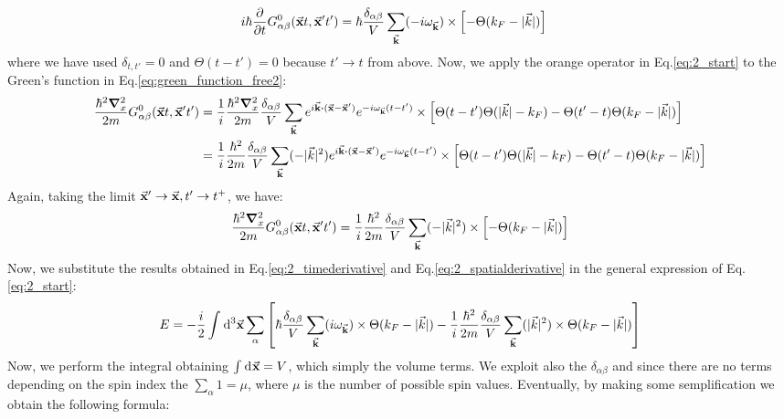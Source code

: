 \documentclass[11pt, a4paper, twoside, openright]{article}
\begin{document}
\begin{equation}
\begin{split}
i \hbar \pdv{}{t} G_{\alpha \beta }^0 (\va{x}t,\va{x}'t') &=
 \hbar \frac{\delta _{\alpha \beta }}{V} \sum_{\va{k}}^{} (- i  \omega _{\va{k}})
 \times \qty[ -  \Theta (k_F- | \vec{k} | )]
\end{split}
\label{eq:2_timederivative}
\end{equation}
where we have used \( \delta _{t,t'} =0 \) and \( \Theta (t-t') =0 \) because \( t' \rightarrow t \) from above.
Now, we apply the orange operator in Eq.\eqref{eq:2_start} to the Green's function in Eq.\eqref{eq:green_function_free2}:
\begin{equation*}
\begin{split}
\frac{\hbar ^2 \grad ^2_x}{2m} G_{\alpha \beta }^0 (\va{x}t,\va{x}'t') &= \frac{1}{i} \frac{\hbar ^2 \grad ^2_x}{2m}
\frac{\delta _{\alpha \beta }}{V}
\sum_{\va{k}}^{} e^{i \va{k}\vdot (\va{x}-\va{x}')}
e^{-i \omega _{\va{k}} (t-t')}
 \times \qty[ \Theta (t-t') \Theta (\absvec{k} -k_F) - \Theta (t'-t) \Theta (k_F- \absvec{k} )]
 \\
&= \frac{1}{i} \frac{\hbar ^2}{2m}
\frac{\delta _{\alpha \beta }}{V}
\sum_{\va{k}}^{} (- \absvec{k} ^2) e^{i \va{k}\vdot (\va{x}-\va{x}')}
e^{-i \omega _{\va{k}} (t-t')}
 \times \qty[ \Theta (t-t') \Theta (\absvec{k} -k_F) - \Theta (t'-t) \Theta (k_F- \absvec{k} )]
\end{split}
\end{equation*}
Again, taking the limit \( \va{x}' \rightarrow \va{x}, t' \rightarrow t^+ \), we have:
\begin{equation}
\frac{\hbar ^2 \grad ^2_x}{2m} G_{\alpha \beta }^0 (\va{x}t,\va{x}'t') =
\frac{1}{i} \frac{\hbar ^2}{2m}
\frac{\delta _{\alpha \beta }}{V}
\sum_{\va{k}}^{} (- | \vec{k} | ^2)
\times \qty[ -  \Theta (k_F- | \vec{k} | )]
\label{eq:2_spatialderivative}
\end{equation}
Now, we substitute the results obtained in Eq.\eqref{eq:2_timederivative} and Eq.\eqref{eq:2_spatialderivative} in the general expression of Eq.\eqref{eq:2_start}:
\begin{equation*}
  E = -\frac{i}{2}
  \int_{}^{} \dd[3]{\va{x}}
  \sum_{\alpha }^{}
  \qty[
  \hbar \frac{\delta _{\alpha \beta }}{V} \sum_{\va{k}}^{} ( i  \omega _{\va{k}})
  \times  \Theta (k_F- | \vec{k} | )
  - \frac{1}{i} \frac{\hbar ^2}{2m}
  \frac{\delta _{\alpha \beta }}{V}
  \sum_{\va{k}}^{} ( | \vec{k} | ^2)
  \times  \Theta (k_F- | \vec{k} | )
  ]
\end{equation*}
Now, we perform the integral obtaining \( \int_{}^{} \dd[]{\va{x}} = V  \), which simply the volume terms. We exploit also the \( \delta _{\alpha \beta } \) and since there are no terms depending on the spin index the \( \sum_{\alpha }^{} 1 = \mu    \), where \( \mu  \) is the number of possible spin values. Eventually, by making some semplification we obtain the following formula:
\end{document}

